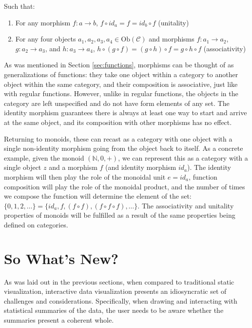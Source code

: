 \documentclass[12pt,a4paper]{article}
\begin{document}
Such that:

\begin{enumerate}
\renewcommand{\theenumi}{\alph{enumi}}
\item For any morphism $f: a \to b$, $f \circ id_a = f = id_b \circ f$ (unitality)
\item For any four objects $a_1, a_2, a_3, a_4 \in \text{Ob}(\mathcal{C})$ and morphisms $f: a_1 \to a_2$, $g: a_2 \to a_3$, and $h: a_3 \to a_4$, $h \circ (g \circ f) = (g \circ h) \circ f = g \circ h \circ f$ (associativity)
\end{enumerate}


As was mentioned in Section \ref{sec:functions}, morphisms can be thought of as generalizations of functions: they take one object within a category to another object within the same category, and their composition is associative, just like with regular functions. However, unlike in regular functions, the objects in the category are left unspecified and do not have form elements of any set. The identity morphism guarantees there is always at least one way to start and arrive at the same object, and its composition with other morphisms has no effect.

Returning to monoids, these can recast as a category with one object with a single non-identity morphism going from the object back to itself. As a concrete example, given the monoid $(\mathbb{N}, 0, +)$, we can represent this as a category with a single object $z$ and a morphism $f$ (and identity morphism $id_a$). The identity morphism will then play the role of the monoidal unit $e = id_a$, function composition will play the role of the monoidal product, and the number of times we compose the function will determine the element of the set: $\{0, 1, 2, \ldots \} = \{id_a, f, (f \circ f), (f \circ f \circ f), \ldots \}$. The associativity and unitality properties of monoids will be fulfilled as a result of the same properties being defined on categories.  


\section{So What's New?}
\label{sec:whatsnew}

As was laid out in the previous sections, when compared to traditional static visualization, interactive data visualization presents an idiosyncratic set of challenges and considerations. Specifically, when drawing and interacting with statistical summaries of the data, the user needs to be aware whether the summaries present a coherent whole.
\end{document}
